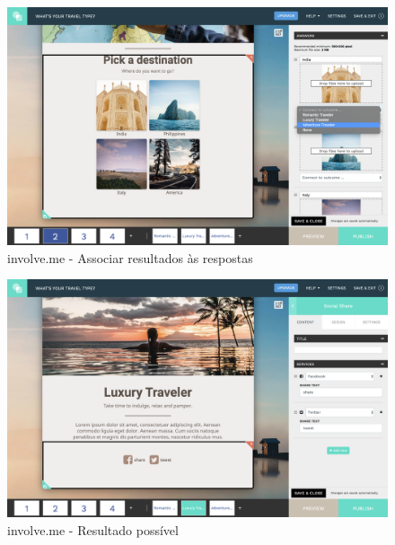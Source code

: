 \newpage
\begin{figure}[ht!]
	\begin{center}
		\includegraphics[width=1\textwidth]{img/ivme/associar}
		\caption{involve.me - Associar resultados às respostas}
		\label{fig:ivme-associar}
	\end{center}
\end{figure}

\begin{figure}[ht!]
	\begin{center}
		\includegraphics[width=1\textwidth]{img/ivme/result}
		\caption{involve.me - Resultado possível}
		\label{fig:ivme-result}
	\end{center}
\end{figure}
 
